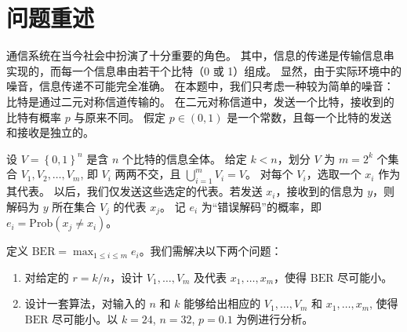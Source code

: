 \section{问题重述}

通信系统在当今社会中扮演了十分重要的角色。
其中，信息的传递是传输信息串实现的，而每一个信息串由若干个比特（0 或 1）组成。
显然，由于实际环境中的噪音，信息传递不可能完全准确。
在本题中，我们只考虑一种较为简单的噪音：比特是通过二元对称信道传输的。
在二元对称信道中，发送一个比特，接收到的比特有概率 \(p\) 与原来不同。
假定 \(p\in(0,1)\) 是一个常数，且每一个比特的发送和接收是独立的。

设 \(V=\left\{0,1\right\}^n\) 是含 \(n\) 个比特的信息全体。
给定 \(k<n\)，划分 \(V\) 为 \(m=2^k\) 个集合 \(V_1,V_2,\dots,V_m\),
即 \(V_i\) 两两不交，且 \(\bigcup_{i=1}^m V_i=V\)。
对每个 \(V_i\)，选取一个 \(x_i\) 作为其代表。
以后，我们仅发送这些选定的代表。若发送 \(x_i\)，接收到的信息为 \(y\)，则解码为 \(y\) 所在集合 \(V_j\) 的代表 \(x_j\)。
记 \(e_i\) 为“错误解码”的概率，即 \(e_i=\mathrm{Prob}\left(x_j\ne x_i\right)\)。

定义 \(\mathrm{BER}=\max_{1\le i\le m}e_i\)。我们需解决以下两个问题：
\begin{enumerate}[nosep]
  \item 对给定的 \(r=k/n\)，设计 \(V_1,\dots,V_m\) 及代表 \(x_1,\dots,x_m\)，使得 \(\mathrm{BER}\) 尽可能小。
  \item 设计一套算法，对输入的 \(n\) 和 \(k\) 能够给出相应的 \(V_1,\dots,V_m\) 和 \(x_1,\dots,x_m\),
  使得 \(\mathrm{BER}\) 尽可能小。以 \(k=24\), \(n=32\), \(p=0.1\) 为例进行分析。
\end{enumerate}